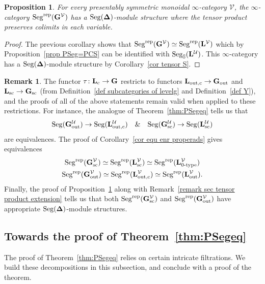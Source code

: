 \documentclass{amsart}
\numberwithin{theorem}{subsection}
\newtheorem{proposition}[theorem]{Proposition}
\theoremstyle{definition}
\newtheorem{remark}[theorem]{Remark}
\newcommand{\xU}{\mathcal{U}}
\newcommand{\xV}{\mathcal{V}}
\newcommand{\icat}{$\infty$-category}
\newcommand{\name}[1]{\ensuremath{\text{\textup{#1}}}}
\newcommand{\simp}{\mathbf{\Delta}}
\newcommand{\levelg}{\mathbf{L}}
\newcommand{\levelV}{\levelg^\xV}
\newcommand{\levelU}{\levelg^\xU}
\newcommand{\levelgconn}{\levelg_{\name{c}}}
\newcommand{\bbY}{\mathbf{G}}
\newcommand{\bbYout}{\bbY_{\name{out}}}
\newcommand{\Seg}{\name{Seg}}
\newcommand{\Segrep}{\Seg^{\name{rep}}}
\begin{document}
\begin{proposition}\label{cor:PCStensor}
	For every presentably symmetric monoidal \icat{} $\xV$, the $\infty$-category $\Segrep(\bbY^\xV)$ has a $\Seg(\simp)$-module structure where the tensor product preserves colimits in each variable.
\end{proposition}
\begin{proof}
	The previous corollary shows that $\Segrep(\bbY^\xV)\simeq \Segrep(\levelV)$ which by Proposition~\ref{prop PSeg=PCS} can be identified with $\Seg_\mathbb{S}(\levelU)$. 
	This $\infty$-category has a $\Seg(\simp)$-module structure by Corollary~\ref{cor tensor S}.
\end{proof}

\begin{remark}\label{remark sec comparison extensions}
The functor $\tau \colon \levelgconn \to \bbY$ restricts to functors $\levelg_{\name{out,c}} \to \bbYout$ and $\levelg_{\name{sc}} \to \bbY_{\name{sc}}$ (from Definition~\ref{def subcategories of levelg} and Definition~\ref{def Y}), and the proofs of all of the above statements remain valid when applied to these restrictions.
For instance, the analogue of Theorem~\ref{thm:PSegeq} tells us that 
\[
	\Seg(\bbYout^\xU) \to \Seg(\levelg_{\name{out,c}}^\xU) \quad \& \quad \Seg(\bbY_{\name{sc}}^\xU) \to \Seg(\levelg_{\name{sc}}^\xU)
\]
are equivalences.
The proof of Corollary~\ref{cor equ enr properads} gives equivalences 
\[ \begin{gathered}
\Segrep(\bbY_{\name{sc}}^\xV) \simeq \Segrep(\levelg_{\name{sc}}^\xV)\simeq \Segrep(\levelg_{\name{0-type}}^\xV) \\
\Segrep(\bbYout^\xV) \simeq \Segrep(\levelg_{\name{out,c}}^\xV)\simeq \Segrep(\levelg_{\name{out}}^\xV).
\end{gathered} \]
Finally, the proof of Proposition~\ref{cor:PCStensor} along with Remark~\ref{remark sec tensor product extension} tells us that both $\Segrep(\bbY_{\name{sc}}^\xV)$ and $\Segrep(\bbYout^\xV)$ have appropriate $\Seg(\simp)$-module structures.
\end{remark}

\subsection{Towards the proof of Theorem~\ref{thm:PSegeq}}
\label{subsection comparison proof}
The proof of Theorem~\ref{thm:PSegeq} relies on certain intricate filtrations.
We build these decompositions in this subsection, and conclude with a proof of the theorem.
\end{document}
